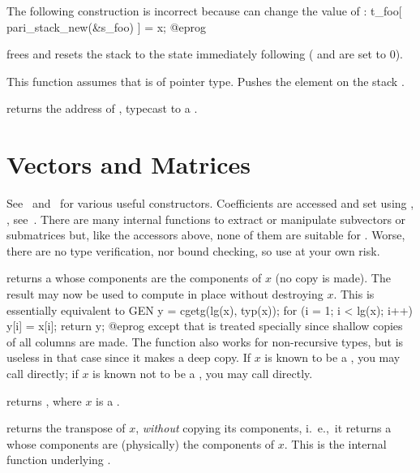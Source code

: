  The following construction is incorrect because
 can change the value of :
\bprog
t_foo[ pari_stack_new(&s_foo) ] = x;
@eprog

 frees  and resets the
stack to the state immediately following  ( and
 are set to $0$).

 This function assumes
that  is of pointer type. Pushes the element  on the stack
.

 returns the address of ,
typecast to a .

\section{Vectors and Matrices}

See~ and~ for various useful constructors.
Coefficients are accessed and set using , ,
see~. There are many internal functions to extract or
manipulate subvectors or submatrices but, like the accessors above, none of
them are suitable for . Worse, there are no type
verification, nor bound checking, so use at your own risk.

 returns a  whose components are the
components of $x$ (no copy is made). The result may now be used to compute in
place without destroying $x$. This is essentially equivalent to
\bprog
  GEN y = cgetg(lg(x), typ(x));
  for (i = 1; i < lg(x); i++) y[i] = x[i];
  return y;
@eprog\noindent
except that  is treated specially since shallow copies of all columns
are made. The function also works for non-recursive types, but is useless
in that case since it makes a deep copy. If $x$ is known to be a , you
may call  directly; if $x$ is known not to be a ,
you may call  directly.

 returns , where $x$
is a .

 returns the transpose of $x$, \emph{without}
copying its components, i.~e.,~it returns a  whose components are
(physically) the components of $x$. This is the internal function underlying
.


